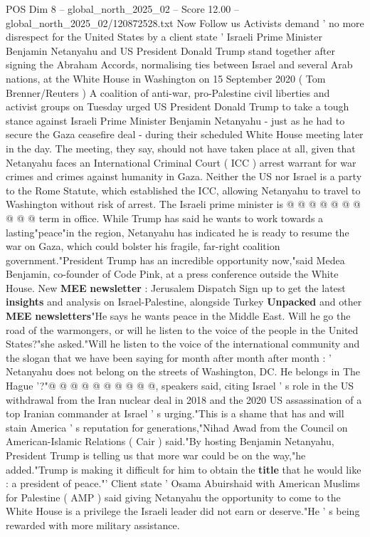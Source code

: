 \begin{textsample}{POS Dim 8 – global\_north\_2025\_02 – Score 12.00 – global\_north\_2025\_02/120872528.txt}  \label{ex:f8_pos_019}
Now Follow us Activists demand ' no more disrespect for the United States by a client state ' Israeli Prime Minister Benjamin Netanyahu and US President Donald Trump stand together after signing the Abraham Accords, normalising ties between Israel and several Arab nations, at the White House in Washington on 15 September 2020 ( Tom Brenner/Reuters ) A coalition of anti-war, pro-Palestine civil liberties and activist groups on Tuesday urged US President Donald Trump to take a tough stance against Israeli Prime Minister Benjamin Netanyahu - just as he had to secure the Gaza ceasefire deal - during their scheduled White House meeting later in the day.
The meeting, they say, should not have taken place at all, given that Netanyahu faces an International Criminal Court ( ICC ) arrest warrant for war crimes and crimes against humanity in Gaza.
Neither the US nor Israel is a party to the Rome Statute, which established the ICC, allowing Netanyahu to travel to Washington without risk of arrest.
The Israeli prime minister is @ @ @ @ @ @ @ @ @ @ term in office.
While Trump has said he wants to work towards a lasting"peace"in the region, Netanyahu has indicated he is ready to resume the war on Gaza, which could bolster his fragile, far-right coalition government."President Trump has an incredible opportunity now,"said Medea Benjamin, co-founder of Code Pink, at a press conference outside the White House.
New \textbf{MEE} \textbf{newsletter} : Jerusalem Dispatch Sign up to get the latest \textbf{insights} and analysis on Israel-Palestine, alongside Turkey \textbf{Unpacked} and other \textbf{MEE} \textbf{newsletters}"He says he wants peace in the Middle East.
Will he go the road of the warmongers, or will he listen to the voice of the people in the United States?"she asked."Will he listen to the voice of the international community and the slogan that we have been saying for month after month after month : ' Netanyahu does not belong on the streets of Washington, DC.
He belongs in The Hague '?"@ @ @ @ @ @ @ @ @ @, speakers said, citing Israel ' s role in the US withdrawal from the Iran nuclear deal in 2018 and the 2020 US assassination of a top Iranian commander at Israel ' s urging."This is a shame that has and will stain America ' s reputation for generations,"Nihad Awad from the Council on American-Islamic Relations ( Cair ) said."By hosting Benjamin Netanyahu, President Trump is telling us that more war could be on the way,"he added."Trump is making it difficult for him to obtain the \textbf{title} that he would like : a president of peace."' Client state ' Osama Abuirshaid with American Muslims for Palestine ( AMP ) said giving Netanyahu the opportunity to come to the White House is a privilege the Israeli leader did not earn or deserve."He ' s being rewarded with more military assistance.

\end{textsample}
